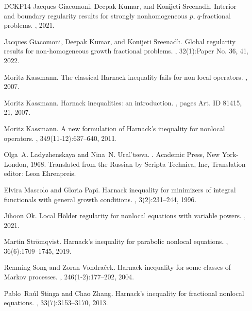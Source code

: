 \documentclass[11pt]{amsart}
\theoremstyle{plain}
\theoremstyle{definition}
\numberwithin{equation}{section}
\begin{document}
\begin{thebibliography}{DCKP14}
Jacques Giacomoni, Deepak Kumar, and Konijeti Sreenadh.
\newblock Interior and boundary regularity results for strongly nonhomogeneous
  $p$, $q$-fractional problems.
, 2021.

Jacques Giacomoni, Deepak Kumar, and Konijeti Sreenadh.
\newblock Global regularity results for non-homogeneous growth fractional
  problems.
, 32(1):Paper No. 36, 41, 2022.

Moritz Kassmann.
\newblock The classical {H}arnack inequality fails for non-local operators.
, 2007.

Moritz Kassmann.
\newblock Harnack inequalities: an introduction.
, pages Art. ID 81415, 21, 2007.

Moritz Kassmann.
\newblock A new formulation of {H}arnack's inequality for nonlocal operators.
, 349(11-12):637--640, 2011.

Olga~A. Ladyzhenskaya and Nina~N. Ural'tseva.
.
\newblock Academic Press, New York-London, 1968.
\newblock Translated from the Russian by Scripta Technica, Inc, Translation
  editor: Leon Ehrenpreis.

Elvira Mascolo and Gloria Papi.
\newblock Harnack inequality for minimizers of integral functionals with
  general growth conditions.
, 3(2):231--244,
  1996.

Jihoon Ok.
\newblock Local {H}{\"o}lder regularity for nonlocal equations with variable
  powers.
, 2021.

Martin Str\"{o}mqvist.
\newblock Harnack's inequality for parabolic nonlocal equations.
,
  36(6):1709--1745, 2019.

Renming Song and Zoran Vondra\v{c}ek.
\newblock Harnack inequality for some classes of {M}arkov processes.
, 246(1-2):177--202, 2004.

Pablo~Ra\'{u}l Stinga and Chao Zhang.
\newblock Harnack's inequality for fractional nonlocal equations.
, 33(7):3153--3170, 2013.

\end{thebibliography}


%
%
\end{document}
